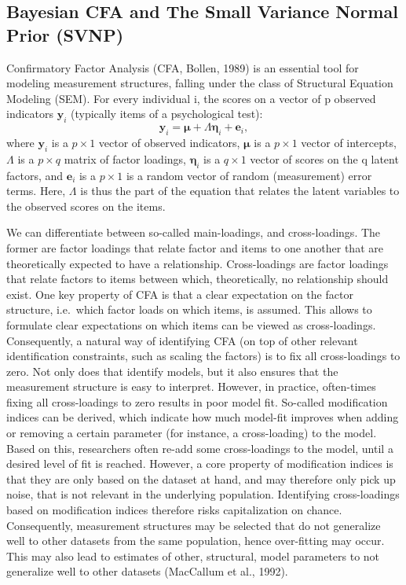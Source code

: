 \documentclass[
  man, donotrepeattitle,floatsintext]{apa6}
\begin{document}
\hypertarget{bayesian-cfa-and-the-small-variance-normal-prior-svnp}{%
\subsection{Bayesian CFA and The Small Variance Normal Prior (SVNP)}\label{bayesian-cfa-and-the-small-variance-normal-prior-svnp}}

Confirmatory Factor Analysis (CFA, Bollen, 1989) is an essential tool for modeling measurement structures, falling under the class of Structural Equation Modeling (SEM). For every individual i, the scores on a vector of p observed indicators \(\mathbf{y}_i\) (typically items of a psychological test):
\[\boldsymbol{y}_i = \boldsymbol{\mu} + \Lambda \boldsymbol{\eta}_i + \boldsymbol{e}_i ,\]
where \(\boldsymbol{y}_i\) is a \(p \times 1\) vector of observed indicators, \(\boldsymbol{\mu}\) is a \(p \times 1\) vector of intercepts, \(\Lambda\) is a \(p \times q\) matrix of factor loadings, \(\boldsymbol{\eta}_i\) is a \(q \times 1\) vector of scores on the q latent factors, and \(\boldsymbol{e}_i\) is a \(p \times 1\) is a random vector of random (measurement) error terms. Here, \(\Lambda\) is thus the part of the equation that relates the latent variables to the observed scores on the items.

We can differentiate between so-called main-loadings, and cross-loadings. The former are factor loadings that relate factor and items to one another that are theoretically expected to have a relationship. Cross-loadings are factor loadings that relate factors to items between which, theoretically, no relationship should exist. One key property of CFA is that a clear expectation on the factor structure, i.e.~which factor loads on which items, is assumed. This allows to formulate clear expectations on which items can be viewed as cross-loadings. Consequently, a natural way of identifying CFA (on top of other relevant identification constraints, such as scaling the factors) is to fix all cross-loadings to zero. Not only does that identify models, but it also ensures that the measurement structure is easy to interpret. However, in practice, often-times fixing all cross-loadings to zero results in poor model fit. So-called modification indices can be derived, which indicate how much model-fit improves when adding or removing a certain parameter (for instance, a cross-loading) to the model. Based on this, researchers often re-add some cross-loadings to the model, until a desired level of fit is reached. However, a core property of modification indices is that they are only based on the dataset at hand, and may therefore only pick up noise, that is not relevant in the underlying population. Identifying cross-loadings based on modification indices therefore risks capitalization on chance. Consequently, measurement structures may be selected that do not generalize well to other datasets from the same population, hence over-fitting may occur. This may also lead to estimates of other, structural, model parameters to not generalize well to other datasets (MacCallum et al., 1992).
\end{document}
